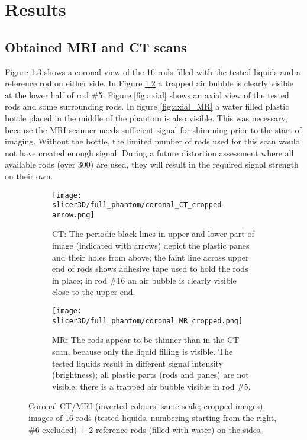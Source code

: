 

\chapter{Results}

\section{Obtained MRI and CT scans}
Figure \ref{fig:coronal} shows a coronal view of the 16 rods filled with the tested liquids and a reference rod on either side.
In Figure \ref{fig:coronal_MR} a trapped air bubble is clearly visible at the lower half of rod \#5.
Figure \ref{fig:axial} shows an axial view of the tested rods and some surrounding rods.
In figure \ref{fig:axial_MR} a water filled plastic bottle placed in the middle of the phantom is also visible.
This was necessary, because the MRI scanner needs sufficient signal for shimming prior to the start of imaging.
Without the bottle, the limited number of rods used for this scan would not have created enough signal.
During a future distortion assessment where all available rods (over 300) are used, they will result in the required signal strength on their own.
 
\begin{figure}[!tbp]
  \begin{subfigure}[b]{\textwidth}
    \texttt{[image: slicer3D/full\_phantom/coronal\_CT\_cropped-arrow.png]}
    \caption{CT: The periodic black lines in upper and lower part of image (indicated with arrows) depict the plastic panes and their holes from above; the faint line across upper end of rods shows adhesive tape used to hold the rods in place; in rod \#16 an air bubble is clearly visible close to the upper end.}
    \label{fig:coronal_CT}
  \end{subfigure}
  \begin{subfigure}[b]{1\textwidth}
    \texttt{[image: slicer3D/full\_phantom/coronal\_MR\_cropped.png]}
    \caption{MR: The rods appear to be thinner than in the CT scan, because only the liquid filling is visible. The tested liquids result in different signal intensity (brightness); all plastic parts (rods and panes) are not visible; there is a trapped air bubble visible in rod \#5.}
    \label{fig:coronal_MR}
  \end{subfigure}
  \caption[Coronal images of rods filled with tested liquids.]{Coronal CT/MRI (inverted colours; same scale; cropped images) images of 16 rods (tested liquids, numbering starting from the right, \#6 excluded) + 2 reference rods (filled with water) on the sides.}
  \label{fig:coronal}
\end{figure}

